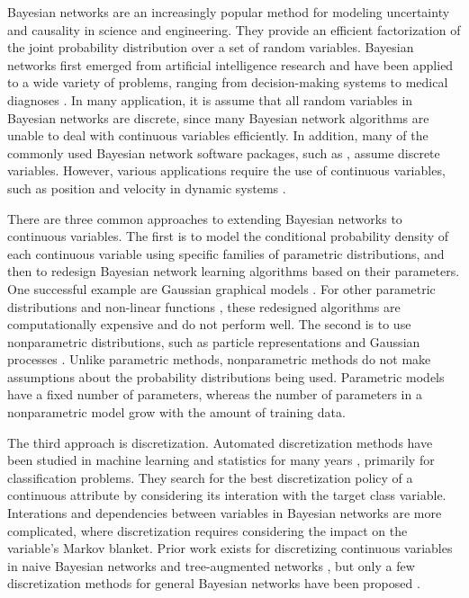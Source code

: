 Bayesian networks \citep{Pearl_1988, PGM_2009} are an increasingly popular method for modeling uncertainty and causality in science and engineering.
They provide an efficient factorization of the joint probability distribution over a set of random variables.
Bayesian networks first emerged from artificial intelligence research and have been applied to a wide variety of problems, ranging from decision-making systems \citep{DMU_2015}  to medical diagnoses \citep{Lustgarten_2011}.
In many application, it is assume that all random variables in Bayesian networks are discrete, since many Bayesian network algorithms are unable to deal with continuous variables efficiently. In addition, many of the commonly used Bayesian network software packages, such as , assume discrete variables. However, various applications require the use of continuous variables, such as position and velocity in dynamic systems \citep{kochenderfer2010airspace}.

There are three common approaches to extending Bayesian networks to continuous variables.
The first is to model the conditional probability density of each continuous variable using specific families of parametric distributions, and then to redesign Bayesian network learning algorithms based on their parameters.
One successful example are Gaussian graphical models \citep{Weiss_2011}.
For other parametric distributions and non-linear functions \citep{Ihler_2009}, these redesigned algorithms are computationally expensive and do not perform well.
The second is to use nonparametric distributions, such as particle representations and Gaussian processes \citep{Ickstadt_2010}.
Unlike parametric methods, nonparametric methods do not make assumptions about the probability distributions being used.
Parametric models have a fixed number of parameters, whereas the number of parameters in a nonparametric model grow with the amount of training data.

The third approach is discretization.
Automated discretization methods have been studied in machine learning and statistics for many years \citep{Dougherty_1995, Kerber_1992, Holte_1993, Fayyad_1993}, primarily for classification problems.
They search for the best discretization policy of a continuous attribute by considering its interation with the target class variable.
Interations and dependencies between variables in Bayesian networks are more complicated, where discretization requires considering the impact on the variable's Markov blanket.
Prior work exists for discretizing continuous variables in naive Bayesian networks and tree-augmented networks \citep{Fried_naive}, but only a few discretization methods for general Bayesian networks have been proposed \citep{Friedman_1996, Kozlov_1997, Monti_1998, Steck_2007}.


